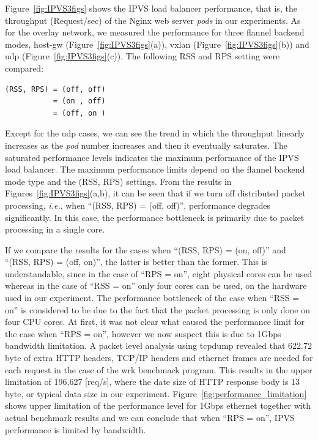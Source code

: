 Figure~\ref{fig:IPVS3figs} shows the IPVS load balancer performance, that is, 
the throughput (Request/sec) of the Nginx web server {\em pods} in our experiments.
As for the overlay network, we measured the performance for three flannel backend modes, 
host-gw (Figure~\ref{fig:IPVS3figs}(a)), vxlan (Figure~\ref{fig:IPVS3figs}(b)) and udp (Figure~\ref{fig:IPVS3figs}(c)).
The following RSS and RPS setting were compared: 

\begin{center}
\begin{minipage}{0.8\columnwidth}
\begin{verbatim}
(RSS, RPS) = (off, off)
           = (on , off)
           = (off, on )
\end{verbatim}
\end{minipage}
\end{center}

Except for the udp cases, we can see the trend in which the throughput linearly increases 
as the {\em pod} number increases and then it eventually saturates.
The saturated performance levels indicates the maximum performance of the IPVS load balancer.
The maximum performance limits depend on the flannel backend mode type and the (RSS, RPS) settings.
From the results in Figures~\ref{fig:IPVS3figs}(a,b), it can be seen that if we turn off distributed packet processing,
{\it i.e.}, when \enquote{(RSS, RPS) = (off, off)}, performance degrades significantly. 
In this case, the performance bottleneck is primarily due to packet processing in a single core.

If we compare the results for the cases when \enquote{(RSS, RPS) = (on, off)} and \enquote{(RSS, RPS) = (off, on)},
the latter is better than the former.
This is understandable, since in the case of \enquote{RPS = on}, eight physical cores can be used whereas 
in the case of \enquote{RSS = on} only four cores can be used, on the hardware used in our experiment.
The performance bottleneck of the case when \enquote{RSS = on} is considered 
to be due to the fact that the packet processing is only done on four CPU cores.
%
At first, it was not clear what caused the performance limit for the case when \enquote{RPS = on},
however we now suspect this is due to 1Gbps bandwidth limitation.
A packet level analysis using tcpdump\cite{jacobson1989tcpdump} revealed that 622.72 byte of extra HTTP headers, 
TCP/IP headers and ethernet frames are needed for each request in the case of the wrk benchmack program.  
This results in the upper limitation of 196,627 [req/s], where the date size of HTTP response body is 13 byte, or typical data size in our experiment. 
Figure~\ref{fig:performance_limitation} shows upper limitation of the performance level for 1Gbps ethernet together with 
actual benchmark results and we can conclude that when \enquote{RPS = on}, IPVS performance is limited by bandwidth.

